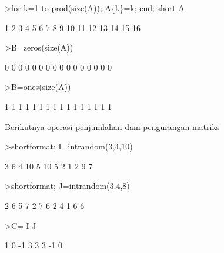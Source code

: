 \documentclass[a4paper,10pt]{article}
\begin{document}
\begin{eulernotebook}
\begin{eulercomment}
\begin{eulercomment}
\begin{eulercomment}
\begin{eulercomment}
\begin{eulercomment}
\begin{eulercomment}
\begin{eulercomment}
\begin{eulercomment}
\begin{eulercomment}
\begin{eulercomment}
\begin{euleroutput}
\end{euleroutput}
\begin{eulerprompt}
>for k=1 to prod(size(A)); A\{k\}=k; end; short A
\end{eulerprompt}
\begin{euleroutput}
          1         2         3         4 
          5         6         7         8 
          9        10        11        12 
         13        14        15        16 
\end{euleroutput}
\begin{eulerprompt}
>B=zeros(size(A))
\end{eulerprompt}
\begin{euleroutput}
          0         0         0         0 
          0         0         0         0 
          0         0         0         0 
          0         0         0         0 
\end{euleroutput}
\begin{eulerprompt}
>B=ones(size(A))
\end{eulerprompt}
\begin{euleroutput}
          1         1         1         1 
          1         1         1         1 
          1         1         1         1 
          1         1         1         1 
\end{euleroutput}
\begin{eulercomment}
Berikutnya operasi penjumlahan dam pengurangan matriks
\end{eulercomment}
\begin{eulerprompt}
>shortformat; I=intrandom(3,4,10) 
\end{eulerprompt}
\begin{euleroutput}
          3         6         4        10 
          5        10         5         2 
          1         2         9         7 
\end{euleroutput}
\begin{eulerprompt}
>shortformat; J=intrandom(3,4,8)
\end{eulerprompt}
\begin{euleroutput}
          2         6         5         7 
          2         7         6         2 
          4         1         6         6 
\end{euleroutput}
\begin{eulerprompt}
>C= I-J
\end{eulerprompt}
\begin{euleroutput}
          1         0        -1         3 
          3         3        -1         0 

\end{euleroutput}
\end{eulercomment}
\end{eulercomment}
\end{eulercomment}
\end{eulercomment}
\end{eulercomment}
\end{eulercomment}
\end{eulercomment}
\end{eulercomment}
\end{eulercomment}
\end{eulercomment}
\end{eulernotebook}
\end{document}

